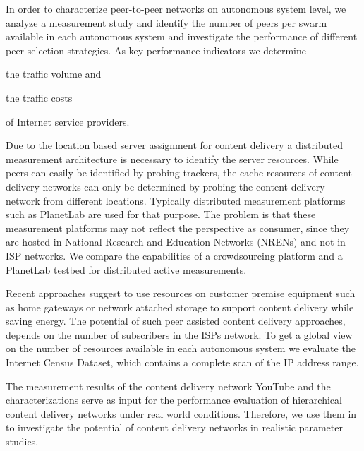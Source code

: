 In order to characterize peer-to-peer networks on autonomous system level,
we analyze a measurement study and identify the number of peers per swarm available in each autonomous system and investigate the performance of different peer selection strategies.
As key performance indicators we determine
\begin{enumerate*}
\item the traffic volume and
\item the traffic costs
\end{enumerate*}
of Internet service providers.

Due to the location based server assignment for content delivery a distributed measurement architecture is necessary to identify the server resources.
While peers can easily be identified by probing trackers, the cache resources of content delivery networks can only be determined by probing the content delivery network from different locations.
Typically distributed measurement platforms such as PlanetLab are used for that purpose.
The problem is that these measurement platforms may not reflect the perspective as consumer, since they are hosted in National Research and Education Networks (NRENs) and not in ISP networks.
We compare the capabilities of a crowdsourcing platform and a PlanetLab testbed for distributed active measurements.

Recent approaches \cite{valancius2009greening} suggest to use resources on customer premise equipment such as home gateways or network attached storage to support content delivery while saving energy.
The potential of such peer assisted content delivery approaches, depends on the number of subscribers in the ISPs network.
To get a global view on the number of resources available in each autonomous system we evaluate the Internet Census Dataset, which contains a complete scan of the IP address range.


The measurement results of the content delivery network YouTube and the characterizations serve as input for the performance evaluation of hierarchical content delivery networks under real world conditions.
Therefore, we use them in  to investigate the potential of content delivery networks in realistic parameter studies.

